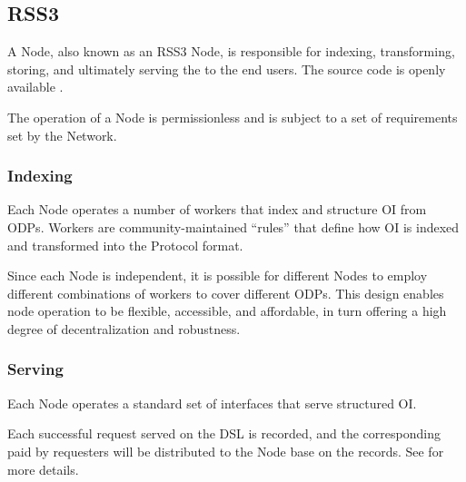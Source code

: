 \subsection{RSS3 }
\label{subsec:Node}

A \gls{Node}, also known as an RSS3 Node, is responsible for indexing, transforming, storing, and ultimately serving the  to the end users.
The source code is openly available \cite{rss3node}.

The operation of a \gls{Node} is permissionless and is subject to a set of requirements set by the Network.

\subsubsection{Indexing}
Each \gls{Node} operates a number of workers that index and structure \gls{OI} from \glspl{ODP}.
Workers are community-maintained ``rules'' that define how \gls{OI} is indexed and transformed into the \gls{Protocol} format.

Since each \gls{Node} is independent, it is possible for different \glspl{Node} to employ different combinations of workers to cover different \glspl{ODP}.
This design enables node operation to be flexible, accessible, and affordable, in turn offering a high degree of decentralization and robustness.

\subsubsection{Serving}
Each \gls{Node} operates a standard set of interfaces that serve structured \gls{OI}.

Each successful request served on the \gls{DSL} is recorded, and the corresponding  paid by requesters will be distributed to the \gls{Node} base on the records.
See  for more details.